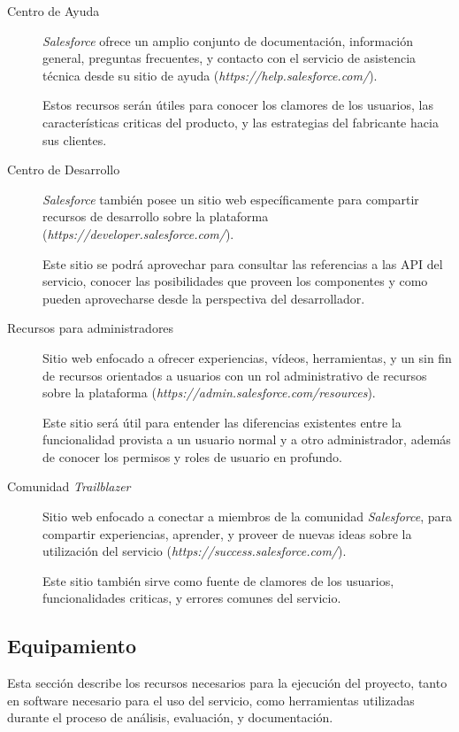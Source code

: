 \begin{description}
\item [Centro de Ayuda] \emph{Salesforce} ofrece un amplio conjunto de
documentación, información general, preguntas frecuentes, y contacto con el
servicio de asistencia técnica desde su sitio de ayuda
(\emph{https://help.salesforce.com/}).

Estos recursos serán útiles para conocer los clamores de los usuarios, las
características criticas del producto, y las estrategias del fabricante hacia
sus clientes.

\item [Centro de Desarrollo] \emph{Salesforce} también posee un sitio web
específicamente para compartir recursos de desarrollo sobre la plataforma
(\emph{https://developer.salesforce.com/}).

Este sitio se podrá aprovechar para consultar las referencias a las API del
servicio, conocer las posibilidades que proveen los componentes y como pueden
aprovecharse desde la perspectiva del desarrollador.

\item [Recursos para administradores] Sitio web enfocado a ofrecer experiencias,
vídeos, herramientas, y un sin fin de recursos orientados a usuarios con un rol
administrativo de recursos sobre la plataforma
(\emph{https://admin.salesforce.com/resources}).

Este sitio será útil para entender las diferencias existentes entre la
funcionalidad provista a un usuario normal y a otro administrador, además de
conocer los permisos y roles de usuario en profundo.

\item [Comunidad \emph{Trailblazer}] Sitio web enfocado a conectar a miembros de
la comunidad \emph{Salesforce}, para compartir experiencias, aprender, y proveer
de nuevas ideas sobre la utilización del servicio
(\emph{https://success.salesforce.com/}).

Este sitio también sirve como fuente de clamores de los usuarios, funcionalidades
criticas, y errores comunes del servicio.

\end{description}

\subsection{Equipamiento}
Esta sección describe los recursos necesarios para la ejecución del
proyecto, tanto en software necesario para el uso del servicio,  como
herramientas utilizadas durante el proceso de análisis, evaluación, y
documentación.

